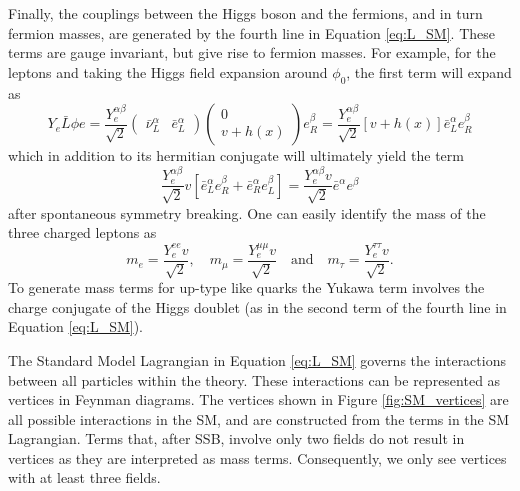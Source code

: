 Finally, the couplings between the Higgs boson and the fermions, and in turn fermion masses, are generated by the fourth line in Equation \eqref{eq:L_SM}. These terms are gauge invariant, but give rise to fermion masses. For example, for the leptons and taking the Higgs field expansion around $\phi_0$, the first term will expand as
\begin{equation*}
    Y_{e}\bar{L}\phi e = \frac{Y_e^{\alpha\beta}}{\sqrt{2}}
    \begin{pmatrix}
        \bar{\nu}_{L}^{\alpha} & \bar{e}_{L}^{\alpha}
    \end{pmatrix}
    \begin{pmatrix}
        0\\
        v + h(x)
    \end{pmatrix}
    e_{R}^{\beta} = \frac{Y_e^{\alpha\beta}}{\sqrt{2}}\left[v + h(x)\right] \bar{e}_{L}^{\alpha}e_{R}^{\beta}
\end{equation*}
which in addition to its hermitian conjugate will ultimately yield the term
\begin{equation*}
    \frac{Y_e^{\alpha\beta}}{\sqrt{2}} v \left[\bar{e}_{L}^{\alpha}e_{R}^{\beta} + \bar{e}_{R}^{\alpha}e_{L}^{\beta}\right] = \frac{Y_e^{\alpha\beta}v}{\sqrt{2}} \bar{e}^{\alpha}e^{\beta}
\end{equation*}
after spontaneous symmetry breaking. One can easily identify the mass of the three charged leptons as
\begin{equation*}
    m_{e} = \frac{Y_e^{ee} v}{\sqrt{2}},\quad m_{\mu} = \frac{Y_e^{\mu\mu} v}{\sqrt{2}}\quad\text{and}\quad m_{\tau} = \frac{Y_e^{\tau\tau} v}{\sqrt{2}}.
\end{equation*}
To generate mass terms for up-type like quarks the Yukawa term involves the charge conjugate of the Higgs doublet (as in the second term of the fourth line in Equation \eqref{eq:L_SM}).

The Standard Model Lagrangian in Equation \eqref{eq:L_SM} governs the interactions between all particles within the theory. These interactions can be represented as vertices in Feynman diagrams. The vertices shown in Figure \ref{fig:SM_vertices} are all possible interactions in the SM, and are constructed from the terms in the SM Lagrangian. Terms that, after SSB, involve only two fields do not result in vertices as they are interpreted as mass terms. Consequently, we only see vertices with at least three fields.

